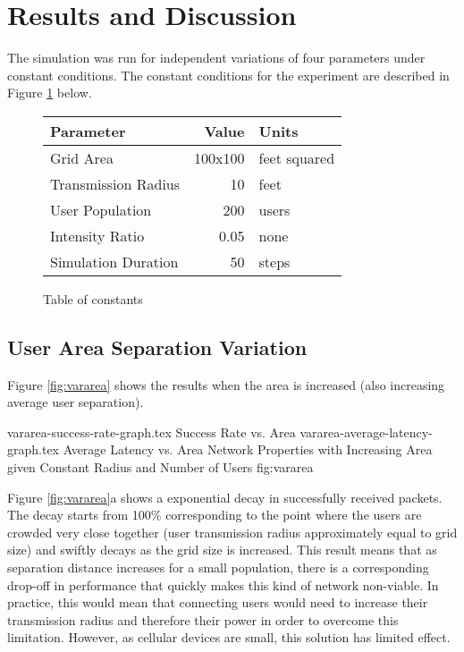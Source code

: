 \section{Results and Discussion}
The simulation was run for independent variations of four parameters under constant conditions.
The constant conditions for the experiment are described in Figure \ref{fig:consttable} below.

\begin{figure}[!htb]
    \centering
    \begin{tabular}{l|rl}
        \hline
        Parameter               & Value     & Units         \\
        \hline
        Grid Area               & 100x100   & feet squared  \\
        Transmission Radius     & 10        & feet          \\
        User Population         & 200       & users         \\
        \hline
        Intensity Ratio         & 0.05      & none          \\
        Simulation Duration     & 50        & steps         \\
        \hline
    \end{tabular}
    \caption{Table of constants}
    \label{fig:consttable}
\end{figure}

\subsection{User Area Separation Variation}
Figure \ref{fig:vararea} shows the results when the area is increased
(also increasing average user separation).

\sidebysidefigures
{vararea-success-rate-graph.tex}       {Success Rate vs. Area}
{vararea-average-latency-graph.tex}    {Average Latency vs. Area}
{Network Properties with Increasing Area given Constant Radius and Number of Users}
{fig:vararea}

Figure \ref{fig:vararea}a shows a exponential decay in successfully received packets.
The decay starts from 100\% corresponding to the point where the users are crowded very close
together (user transmission radius approximately equal to grid size) and swiftly decays as
the grid size is increased.
This result means that as separation distance increases for a small population, there
is a corresponding drop-off in performance that quickly makes this kind of network non-viable.
In practice, this would mean that connecting users would need to increase their transmission radius
and therefore their power in order to overcome this limitation.
However, as cellular devices are small, this solution has limited effect.

